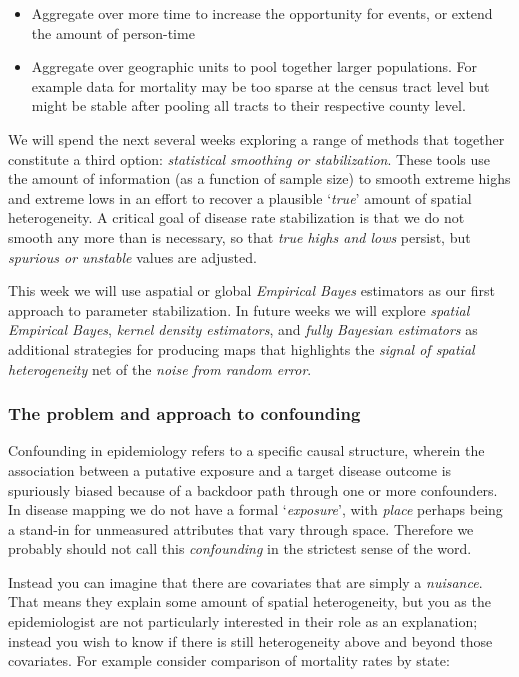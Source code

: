 \documentclass[
]{book}
\providecommand{\tightlist}{%
  \setlength{\itemsep}{0pt}\setlength{\parskip}{0pt}}
\begin{document}
\begin{itemize}
\tightlist
\item
  Aggregate over more time to increase the opportunity for events, or extend the amount of person-time
\item
  Aggregate over geographic units to pool together larger populations. For example data for mortality may be too sparse at the census tract level but might be stable after pooling all tracts to their respective county level.
\end{itemize}

We will spend the next several weeks exploring a range of methods that together constitute a third option: \emph{statistical smoothing or stabilization}. These tools use the amount of information (as a function of sample size) to smooth extreme highs and extreme lows in an effort to recover a plausible `\emph{true}' amount of spatial heterogeneity. A critical goal of disease rate stabilization is that we do not smooth any more than is necessary, so that \emph{true highs and lows} persist, but \emph{spurious or unstable} values are adjusted.

This week we will use aspatial or global \emph{Empirical Bayes} estimators as our first approach to parameter stabilization. In future weeks we will explore \emph{spatial Empirical Bayes}, \emph{kernel density estimators}, and \emph{fully Bayesian estimators} as additional strategies for producing maps that highlights the \emph{signal of spatial heterogeneity} net of the \emph{noise from random error}.

\hypertarget{the-problem-and-approach-to-confounding}{%
\subsubsection{The problem and approach to confounding}\label{the-problem-and-approach-to-confounding}}

Confounding in epidemiology refers to a specific causal structure, wherein the association between a putative exposure and a target disease outcome is spuriously biased because of a backdoor path through one or more confounders. In disease mapping we do not have a formal `\emph{exposure}', with \emph{place} perhaps being a stand-in for unmeasured attributes that vary through space. Therefore we probably should not call this \emph{confounding} in the strictest sense of the word.

Instead you can imagine that there are covariates that are simply a \emph{nuisance}. That means they explain some amount of spatial heterogeneity, but you as the epidemiologist are not particularly interested in their role as an explanation; instead you wish to know if there is still heterogeneity above and beyond those covariates. For example consider comparison of mortality rates by state:
\end{document}
